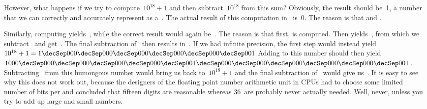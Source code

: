 However, what happens if we try to compute~$10^{18}+1$ and then subtract~$10^{18}$ from this sum?
Obviously, the result should be~1, a number that we can correctly and accurately represent as a~.
The actual result of this computation in \python\ is~0.
The reason is that  and .

Similarly, computing  yields~, while the correct result would again be~.
The reason is that first,  is computed.
Then  yields~, from which we subtract~ and get~.
The final subtraction of~ then results in~.
If we had infinite precision, the first step would instead yield~$10^{18}+1=1\decSep000\decSep000\decSep000\decSep000\decSep000\decSep001$
Adding  to this number should then yield~$1000\decSep000\decSep000\decSep000\decSep000\decSep001\decSep000\decSep000\decSep000\decSep000\decSep000\decSep001$.
Subtracting~ from this humongous number would bring us back to~$10^{18}+1$ and the final subtraction of~ would give us~.
It is easy to see why this does not work out, because the designers of the floating point number arithmetic unit in CPUs had to choose some limited number of bits per  and concluded that fifteen digits are reasonable whereas 36~are probably never actually needed.
Well, never, unless you try to add up large and small numbers.

